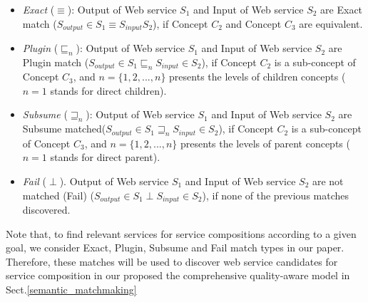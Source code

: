 \documentclass{llncs}
\begin{document}
\begin{itemize}
\item \textit{Exact} ($\equiv$): Output of Web service $S_{1}$ and Input of Web service $S_{2}$ are Exact match ($ S_{output} \in S_{1} \equiv S_{input}S_{2}$), if  Concept $C_{2}$ and Concept $C_{3}$ are equivalent.
\item \textit{Plugin} ($\sqsubseteq_{n}$): Output of Web service $S_{1}$ and Input of Web service $S_{2}$ are Plugin match ($S_{output} \in S_{1} \sqsubseteq_{n} S_{input} \in S_{2}$), if  Concept $C_{2}$ is a sub-concept of Concept $C_{3}$, and $n = \{1,2,...,n \}$ presents the levels of children concepts ($n=1$ stands for direct children).
\item \textit{Subsume} ($\sqsupseteq_{n}$): Output of Web service $S_{1}$ and Input of Web service $S_{2}$ are Subsume matched($S_{output} \in S_{1} \sqsupseteq_{n} S_{input} \in S_{2}$), if  Concept $C_{2}$ is a sub-concept of  Concept $C_{3}$, and $n = \{1,2,...,n \}$ presents the levels of parent concepts ($n=1$ stands for direct parent).
\item \textit{Fail} ($\perp$). Output of Web service $S_{1}$ and Input of Web service $S_{2}$ are not matched (Fail) ($S_{output} \in S_{1} \perp S_{input} \in S_{2}$), if none of the previous matches discovered.
\end{itemize}

Note that, to find relevant services for service compositions according to a given goal, we consider Exact, Plugin, Subsume and Fail match types in our paper. Therefore, these matches will be used to discover web service candidates for service composition in our proposed the comprehensive quality-aware model in Sect.\ref{semantic_matchmaking}
\end{document}
